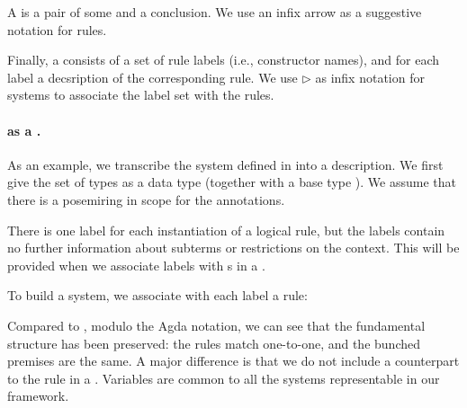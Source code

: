 
A  is a pair of some  and a
conclusion. We use an infix arrow as a suggestive notation for rules.


Finally, a  consists of a set of rule labels (i.e.,
constructor names), and for each label a decsription of the
corresponding rule. We use $\rhd$ as infix notation for systems to
associate the label set with the rules.


\paragraph{ as a .}

As an example, we transcribe the system defined in
 into a description.  We first give the set of
types as a data type (together with a base type
\AgdaInductiveConstructor{$\iota$}). We assume that there is a
posemiring  in scope for the
annotations.


There is one label for each instantiation of a logical rule, but the
labels contain no further information about subterms or restrictions
on the context. This will be provided when we associate labels with
s in a .

\noindent
\begin{minipage}[t]{0.5\textwidth}
\end{minipage}
\begin{minipage}[t]{0.5\textwidth}
\end{minipage}

To build a system, we associate with each label a rule:


Compared to , modulo the Agda notation, we can see
that the fundamental structure has been preserved: the rules match
one-to-one, and the bunched premises are the same. A major difference
is that we do not include a counterpart to the
 rule in a
. Variables are common to all the systems
representable in our framework.

